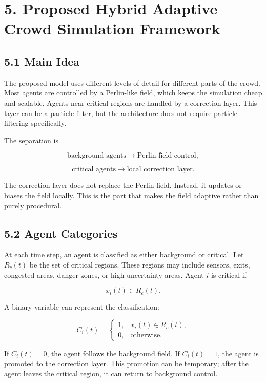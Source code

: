 \documentclass[
  11pt,
]{article}
\begin{document}
\section{5. Proposed Hybrid Adaptive Crowd Simulation
Framework}\label{proposed-hybrid-adaptive-crowd-simulation-framework}

\subsection{5.1 Main Idea}\label{main-idea}

The proposed model uses different levels of detail for different parts
of the crowd. Most agents are controlled by a Perlin-like field, which
keeps the simulation cheap and scalable. Agents near critical regions
are handled by a correction layer. This layer can be a particle filter,
but the architecture does not require particle filtering specifically.

The separation is

\[
\text{background agents} \rightarrow \text{Perlin field control},
\]

\[
\text{critical agents} \rightarrow \text{local correction layer}.
\]

The correction layer does not replace the Perlin field. Instead, it
updates or biases the field locally. This is the part that makes the
field adaptive rather than purely procedural.

\subsection{5.2 Agent Categories}\label{agent-categories}

At each time step, an agent is classified as either background or
critical. Let \(R_c(t)\) be the set of critical regions. These regions
may include sensors, exits, congested areas, danger zones, or
high-uncertainty areas. Agent \(i\) is critical if

\[
x_i(t) \in R_c(t).
\]

A binary variable can represent the classification:

\[
C_i(t)
=
\begin{cases}
1, & x_i(t) \in R_c(t), \\
0, & \text{otherwise}.
\end{cases}
\]

If \(C_i(t)=0\), the agent follows the background field. If
\(C_i(t)=1\), the agent is promoted to the correction layer. This
promotion can be temporary; after the agent leaves the critical region,
it can return to background control.
\end{document}
